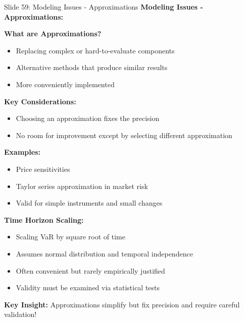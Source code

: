 \documentclass[8pt]{beamer}
\begin{document}
	\begin{frame}{Slide 59: Modeling Issues - Approximations}
		\fontsize{6.5}{7.5}\selectfont
		\textbf{Modeling Issues - Approximations:}
		
		\vspace{0.1cm}
		\textbf{What are Approximations?}
		\begin{itemize}
			\item Replacing complex or hard-to-evaluate components
			\item Alternative methods that produce similar results
			\item More conveniently implemented
		\end{itemize}
		
		\vspace{0.1cm}
		\textbf{Key Considerations:}
		\begin{itemize}
			\item Choosing an approximation fixes the precision
			\item No room for improvement except by selecting different approximation
		\end{itemize}
		
		\vspace{0.1cm}
		\textbf{Examples:}
		\begin{itemize}
			\item Price sensitivities
			\item Taylor series approximation in market risk
			\item Valid for simple instruments and small changes
		\end{itemize}
		
		\vspace{0.1cm}
		\textbf{Time Horizon Scaling:}
		\begin{itemize}
			\item Scaling VaR by square root of time
			\item Assumes normal distribution and temporal independence
			\item Often convenient but rarely empirically justified
			\item Validity must be examined via statistical tests
		\end{itemize}
		
		\textcolor{myblue}{\textbf{Key Insight:}} Approximations simplify but \textcolor{myblue}{fix precision and require careful validation}!
	\end{frame}
	
\end{document}
